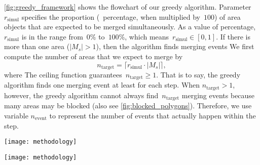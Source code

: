 \documentclass[twocolumn]{svjour3}          %
\begin{document}
\fig\ref{fig:greedy_framework} shows the flowchart of our greedy algorithm.
Parameter $r_\mathrm{simul}$ specifies 
the proportion (\ie~percentage, when multiplied by~$100$) of area objects that
are expected to be merged simultaneously.
As a value of percentage, 
$r_\mathrm{simul}$ is in the range from~$0\%$ to~$100\%$,
which means~$r_\mathrm{simul} \in [0,1]$.
If there is more than one area ($|M_s|>1$),
then the algorithm finds merging events 
We first compute the number of areas that we expect to merge by
\begin{equation}
\label{eq:n_target}
n_\mathrm{target} =
\lceil r_\mathrm{simul} \cdot |M_s| \rceil,
\end{equation}
where 
The ceiling function guarantees~$n_\mathrm{target}\ge 1$.
That is to say, the greedy algorithm 
finds one merging event at least for each step.
When $n_\mathrm{target} > 1$, however,
the greedy algorithm cannot always find~$n_\mathrm{target}$ merging events
because many areas may be blocked
(also see \fig\ref{fig:blocked_polygons}).
Therefore, we use variable $n_\mathrm{event}$
to represent the number of events that actually happen within the step. 


\begin{figure*}[tb]
\centering
\texttt{[image: methodology]}
\caption{The flowchart of our greedy algorithm.
}
\label{fig:greedy_framework}
\end{figure*}


\begin{figure*}[tb]
\centering
\texttt{[image: methodology]}
\caption{The process of finding simultaneous merging events for a single step.
    (a) From all the free areas,
	the least important one is selected to merge into
	its most compatible neighbor.
	Then,  the surrounding areas are blocked 
	(marked by the crosses).
	(b) Next, the least important area from the remaining free areas
	is selected to merge with its most compatible neighbor,
	and the relevant areas are also blocked.
}
\label{fig:blocked_polygons}
\end{figure*}
\end{document}
